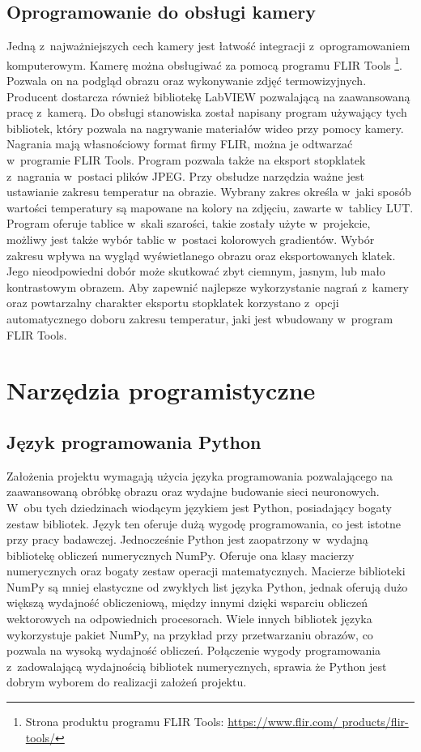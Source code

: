 \subsection{Oprogramowanie do obsługi kamery}
\label{subsec:camera_soft}
Jedną z~najważniejszych cech kamery jest łatwość integracji z~oprogramowaniem
komputerowym.
Kamerę można obsługiwać za pomocą programu FLIR Tools
\footnote{%
    Strona produktu programu FLIR Tools:
    \url{https://www.flir.com/   products/flir-tools/}}.
Pozwala on na podgląd obrazu oraz wykonywanie zdjęć termowizyjnych.
Producent dostarcza również bibliotekę LabVIEW pozwalającą na zaawansowaną
pracę z~kamerą.
Do obsługi stanowiska został napisany program używający tych bibliotek, który
pozwala na nagrywanie materiałów wideo przy pomocy kamery.
Nagrania mają własnościowy format firmy FLIR, można je odtwarzać w~programie
FLIR Tools.
Program pozwala także na eksport stopklatek z~nagrania w~postaci plików JPEG.
Przy obsłudze narzędzia ważne jest ustawianie zakresu temperatur na obrazie.
Wybrany zakres określa w~jaki sposób wartości temperatury są mapowane na kolory
na zdjęciu, zawarte w~tablicy LUT.
Program oferuje tablice w~skali szarości, takie zostały użyte w~projekcie,
możliwy jest także wybór tablic w~postaci kolorowych gradientów.
Wybór zakresu wpływa na wygląd wyświetlanego obrazu oraz eksportowanych klatek.
Jego nieodpowiedni dobór może skutkować zbyt ciemnym, jasnym, lub mało
kontrastowym obrazem.
Aby zapewnić najlepsze wykorzystanie nagrań z~kamery oraz powtarzalny charakter
eksportu stopklatek korzystano z~opcji automatycznego doboru zakresu temperatur, 
jaki jest wbudowany w~program FLIR Tools.

\section{Narzędzia programistyczne}

\subsection{Język programowania Python}
Założenia projektu wymagają użycia języka programowania pozwalającego na
zaawansowaną obróbkę obrazu oraz wydajne budowanie sieci neuronowych.
W~obu tych dziedzinach wiodącym językiem jest Python, posiadający bogaty zestaw
bibliotek.
Język ten oferuje dużą wygodę programowania, co jest istotne przy pracy
badawczej.
Jednocześnie Python jest zaopatrzony w~wydajną bibliotekę obliczeń numerycznych
NumPy.
Oferuje ona klasy macierzy numerycznych oraz bogaty zestaw operacji
matematycznych.
Macierze biblioteki NumPy są mniej elastyczne od zwykłych list języka Python,
jednak oferują dużo większą wydajność obliczeniową, między innymi dzięki
wsparciu obliczeń wektorowych na odpowiednich procesorach.
Wiele innych bibliotek języka wykorzystuje pakiet NumPy, na przykład przy
przetwarzaniu obrazów, co pozwala na wysoką wydajność obliczeń.
Połączenie wygody programowania z~zadowalającą wydajnością bibliotek
numerycznych, sprawia że Python jest dobrym wyborem do realizacji założeń
projektu.

